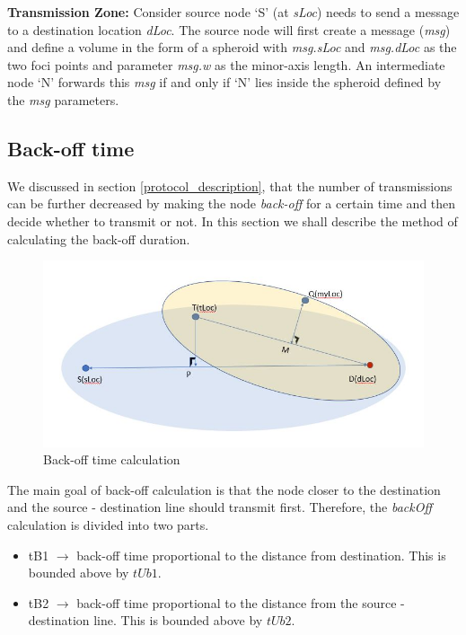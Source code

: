 \textbf{Transmission Zone:} Consider source node `S' (at \emph{sLoc}) needs to send a message to a destination location \emph{dLoc}. The source node will first create a message (\emph{msg}) and define a volume in the form of a spheroid with \emph{msg.sLoc} and \emph{msg.dLoc} as the two foci points and parameter \emph{msg.w} as the minor-axis length. An intermediate node `N' forwards this \emph{msg} if and only if `N' lies inside the spheroid defined by the \emph{msg} parameters.

\subsection{Back-off time}
\label{back_off_time}

We discussed in section \ref{protocol_description}, that the number of transmissions can be further decreased by making the node \emph{back-off} for a certain time and then decide whether to transmit or not. In this section we shall describe the method of calculating the back-off duration. 


\begin{figure}[hbtp]
    \centering
    \includegraphics[width=1\textwidth]{Chapter-4/figs/back_off_time_calc}
    \caption{Back-off time calculation}
    \label{fig:back_off_time_calculation}
\end{figure}


The main goal of back-off calculation is that the node closer to the destination and the source - destination line should transmit first. Therefore, the \emph{backOff} calculation is divided into two parts.
\begin{itemize}
    \item tB1 $\rightarrow$ back-off time proportional to the distance from destination. This is bounded above by $tUb1$. 
    \item tB2 $\rightarrow$ back-off time proportional to the distance from the source - destination line. This is bounded above by $tUb2$.
\end{itemize}

